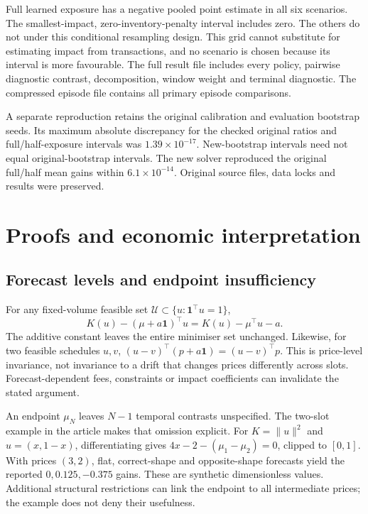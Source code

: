 \documentclass[11pt]{article}
\begin{document}
Full learned exposure has a negative pooled point estimate in all six scenarios. The smallest-impact, zero-inventory-penalty interval includes zero. The others do not under this conditional resampling design. This grid cannot substitute for estimating impact from transactions, and no scenario is chosen because its interval is more favourable. The full result file includes every policy, pairwise diagnostic contrast, decomposition, window weight and terminal diagnostic. The compressed episode file contains all primary episode comparisons.

A separate reproduction retains the original calibration and evaluation bootstrap seeds. Its maximum absolute discrepancy for the checked original ratios and full/half-exposure intervals was $1.39\times10^{-17}$. New-bootstrap intervals need not equal original-bootstrap intervals. The new solver reproduced the original full/half mean gains within $6.1\times10^{-14}$. Original source files, data locks and results were preserved.

\section{Proofs and economic interpretation}
\subsection{Forecast levels and endpoint insufficiency}
For any fixed-volume feasible set $\mathcal U\subset\{u:\mathbf1^\top u=1\}$,
\[
 K(u)-(\mu+a\mathbf1)^\top u=K(u)-\mu^\top u-a.
\]
The additive constant leaves the entire minimiser set unchanged. Likewise, for two feasible schedules $u,v$, $(u-v)^\top(p+a\mathbf1)=(u-v)^\top p$. This is price-level invariance, not invariance to a drift that changes prices differently across slots. Forecast-dependent fees, constraints or impact coefficients can invalidate the stated argument.

An endpoint $\mu_N$ leaves $N-1$ temporal contrasts unspecified. The two-slot example in the article makes that omission explicit. For $K=\|u\|^2$ and $u=(x,1-x)$, differentiating gives $4x-2-(\mu_1-\mu_2)=0$, clipped to $[0,1]$. With prices $(3,2)$, flat, correct-shape and opposite-shape forecasts yield the reported $0,0.125,-0.375$ gains. These are synthetic dimensionless values. Additional structural restrictions can link the endpoint to all intermediate prices; the example does not deny their usefulness.
\end{document}
